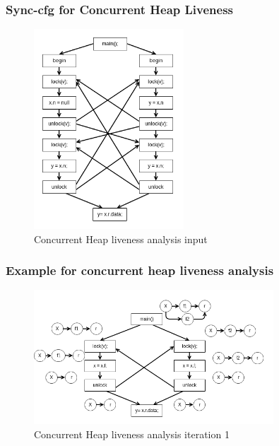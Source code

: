 \documentclass{beamer}
\begin{document}
\begin{frame}
	\frametitle{Sync-cfg for Concurrent Heap Liveness}
	\begin{figure}
		\centering
		\includegraphics[width=0.5\textwidth]{Figures/hra_live_concurrent.png}
		\caption{Concurrent Heap liveness analysis input}
		\label{fig:nullpointeranalysis}
	\end{figure}
	
\end{frame}

\begin{frame}
	\frametitle{Example for concurrent heap liveness analysis}
	\begin{figure}
		\centering
		\includegraphics[width=0.8\textwidth]{Figures/conc_analysis_itr1.png}
		\caption{Concurrent Heap liveness analysis iteration 1}
		\label{fig:nullpointeranalysis}
	\end{figure}
\end{frame}
\end{document}
